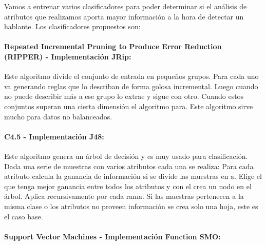 \documentclass[11pt,a4paper,twoside]{tesis}
\begin{document}
Vamos a entrenar varios clasificadores para poder determinar si el análisis de atributos que realizamos aporta mayor información a la hora de detectar un hablante. Los clasificadores propuestos son: 

\paragraph{Repeated Incremental Pruning to Produce Error Reduction (RIPPER) \cite{Cohen1995} - Implementación JRip:}


Este algoritmo divide el conjunto de entrada en pequeños grupos. Para cada uno va generando reglas que lo describan de forma golosa incremental. Luego cuando no puede describir más a ese grupo lo extrae y sigue con otro. Cuando estos conjuntos superan una cierta dimensión el algoritmo para. Este algoritmo sirve mucho para datos no balanceados.

\paragraph{C4.5 \cite{Quinlan1993} - Implementación J48:}


Este algoritmo genera un árbol de decisión y es muy usado para clasificación. Dada una serie de muestras con varios atributos cada una se realiza: Para cada atributo calcula la ganancia de información si se divide las muestras en a. Elige el que tenga mejor ganancia entre todos los atributos y con el crea un nodo en el árbol. Aplica recursivamente por cada rama. Si las muestras pertenecen a la misma clase o los atributos no proveen información se crea solo una hoja, este es el caso base.

\paragraph{Support Vector Machines \cite{Platt98sequentialminimal} - Implementación Function SMO:}

\end{document}
